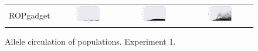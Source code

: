 \documentclass{article}
\begin{document}
\begin{landscape}
\begin{figure}[t]
\begin{center}
\begin{tabular}{c c c c}
    ROPgadget & \includegraphics[align=c,width=0.42\textwidth]{ac/e1/4} & \includegraphics[align=c,width=0.42\textwidth]{ac/e1/5} & \includegraphics[align=c,width=0.42\textwidth]{ac/e1/6} \\
\end{tabular}
\end{center}
\caption{Allele circulation of populations. Experiment 1.}
\label{fig:ac/e1}
\end{figure}


\end{landscape}
\end{document}
